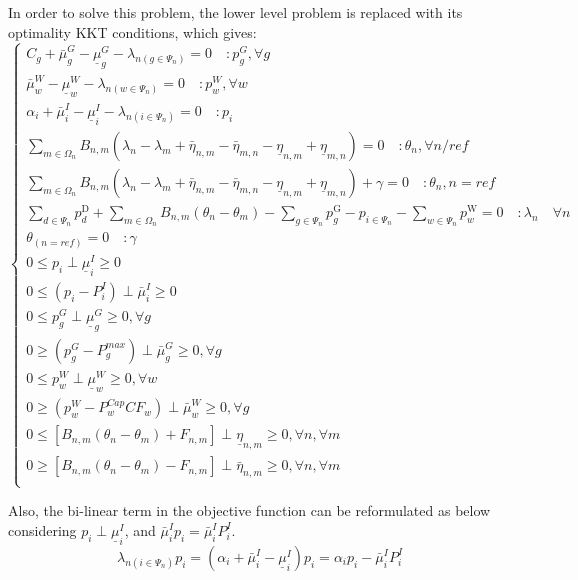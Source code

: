 In order to solve this problem, the lower level problem is replaced with its optimality KKT conditions, which gives:
\begin{equation}
    \begin{cases}
   C_g + \bar{\mu}_g^G - \underline{\mu}_g^G - \lambda_{n(g \in \Psi_{n})} = 0 \quad:p_g^G, \forall g&\\
   \bar{\mu}_w^W - \underline{\mu}_w^W - \lambda_{n(w\in\Psi_n)} = 0 \quad:p_w^W, \forall w &\\
    \alpha_i + \bar{\mu}_i^I - \underline{\mu}_i^I - \lambda_{n(i \in \Psi_{n})} = 0 \quad:p_i&\\
    \sum_{m \in \Omega_n}B_{n,m}(\lambda_n - \lambda_m + \bar{\eta}_{n,m}-\bar{\eta}_{m,n}-\underline{\eta}_{n,m}+\underline{\eta}_{m,n}) = 0 \quad: \theta_n, \forall n/ref&\\
\sum_{m \in \Omega_n}B_{n,m}(\lambda_n - \lambda_m + \bar{\eta}_{n,m}-\bar{\eta}_{m,n}-\underline{\eta}_{n,m}+\underline{\eta}_{m,n})+\gamma = 0 \quad: \theta_n, n=ref&\\
\sum_{d \in \Psi_{n}} p_{d}^{\mathrm{D}}+\sum_{m \in \Omega_{n}} B_{n, m}\left(\theta_{n}-\theta_{m}\right)-\sum_{g \in \Psi_{n}} p_{g}^{\mathrm{G}} - p_{i\in \Psi_n} -\sum_{w \in \Psi_{n}} p_{w}^{\mathrm{W}} =0 \quad: \lambda_{n} \quad \forall n&\\
\theta_{(n=r e f)}=0 \quad: \gamma&\\
0 \leq p_i\perp \underline{\mu}_i^I \geq 0&\\
0 \leq (p_i - P_i^I) \perp \bar{\mu}_i^I \geq 0&\\
    0 \leq p_g^G \perp \underline{\mu}_g^G \geq 0, \forall g&\\
    0 \geq (p_g^G - P_g^{max}) \perp \bar{\mu}_g^G \geq 0, \forall g&\\
    0 \leq p_w^W \perp \underline{\mu}_w^W \geq 0, \forall w&\\
    0 \geq (p_w^W - P_w^{Cap}CF_w) \perp \bar{\mu}_w^W \geq 0, \forall g&\\
  0\leq [B_{n,m}(\theta_n - \theta_m)+F_{n,m}] \perp \underline{\eta}_{n,m} \geq 0, \forall n, \forall m&\\
  0\geq [B_{n,m}(\theta_n - \theta_m)-F_{n,m}] \perp \bar{\eta}_{n,m} \geq 0, \forall n, \forall m&\\
    \end{cases}
\end{equation}

Also, the bi-linear term in the objective function can be reformulated as below considering $p_i\perp \underline{\mu}_i^I$, and $ \bar{\mu}_i^I p_i =\bar{\mu}_i^I P_i^I  $.
\begin{equation}
    \lambda_{n(i\in \Psi_n)}p_i = (\alpha_i + \bar{\mu}_i^I - \underline{\mu}_i^I)p_i = \alpha_i p_i -\bar{\mu}_i^I P_i^I
\end{equation}

